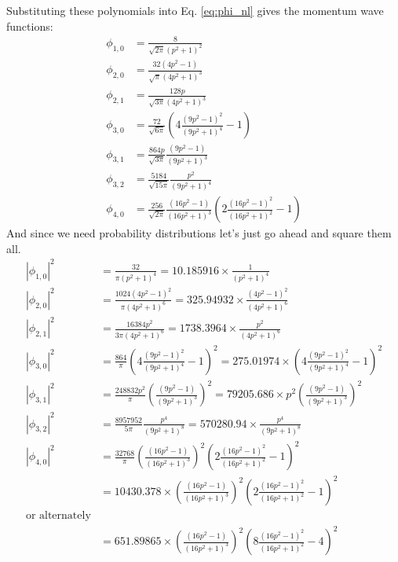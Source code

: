 \documentclass[12pt]{article}
\begin{document}
Substituting these polynomials into Eq. \ref{eq:phi_nl} gives the momentum wave functions:
\begin{align*}
\phi_{1,0}&=\frac{8}{\sqrt{2\pi}(p^2+1)^2}\\
\phi_{2,0}&=\frac{32(4p^2-1)}{\sqrt{\pi}(4p^2+1)^3}\\
\phi_{2,1}&=\frac{128p}{\sqrt{3\pi}(4p^2+1)^3}\\
\phi_{3,0}&=\frac{72}{\sqrt{6\pi}}\left(4\frac{(9p^2-1)^2}{(9p^2+1)^4}-1\right)\\
\phi_{3,1}&=\frac{864p}{\sqrt{3\pi}}\frac{(9p^2-1)}{(9p^2+1)^3}\\
\phi_{3,2}&=\frac{5184}{\sqrt{15\pi}}\frac{p^2}{(9p^2+1)^4}\\
\phi_{4,0}&=\frac{256}{\sqrt{2\pi}}\frac{(16p^2-1)}{(16p^2+1)^3}\left(2\frac{(16p^2-1)^2}{(16p^2+1)^2}-1\right)
\end{align*}
And since we need probability distributions let's just go ahead and square them all.
\begin{align*}
\left|\phi_{1,0}\right|^2&=\frac{32}{\pi(p^2+1)^4}=10.185916\times\frac{1}{(p^2+1)^4}\\
\left|\phi_{2,0}\right|^2&=\frac{1024(4p^2-1)^2}{\pi(4p^2+1)^6}=325.94932\times\frac{(4p^2-1)^2}{(4p^2+1)^6}\\
\left|\phi_{2,1}\right|^2&=\frac{16384p^2}{3\pi(4p^2+1)^6}=1738.3964\times\frac{p^2}{(4p^2+1)^6}\\
\left|\phi_{3,0}\right|^2&=\frac{864}{\pi}\left(4\frac{(9p^2-1)^2}{(9p^2+1)^4}-1\right)^2=275.01974\times\left(4\frac{(9p^2-1)^2}{(9p^2+1)^4}-1\right)^2\\
\left|\phi_{3,1}\right|^2&=\frac{248832p^2}{\pi}\left(\frac{(9p^2-1)}{(9p^2+1)^3}\right)^2=79205.686\times p^2\left(\frac{(9p^2-1)}{(9p^2+1)^3}\right)^2\\
\left|\phi_{3,2}\right|^2&=\frac{8957952}{5\pi}\frac{p^4}{(9p^2+1)^8}=570280.94\times\frac{p^4}{(9p^2+1)^8}\\
\left|\phi_{4,0}\right|^2&=\frac{32768}{\pi}\left(\frac{(16p^2-1)}{(16p^2+1)^3}\right)^2\left(2\frac{(16p^2-1)^2}{(16p^2+1)^2}-1\right)^2\\~&=10430.378\times\left(\frac{(16p^2-1)}{(16p^2+1)^3}\right)^2\left(2\frac{(16p^2-1)^2}{(16p^2+1)^2}-1\right)^2\\\textrm{or alternately}\\
~&=651.89865\times\left(\frac{(16p^2-1)}{(16p^2+1)^3}\right)^2\left(8\frac{(16p^2-1)^2}{(16p^2+1)^2}-4\right)^2
\end{align*}

%


\end{document}
